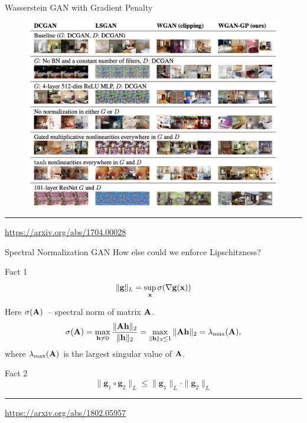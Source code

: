 \begin{frame}{Wasserstein GAN with Gradient Penalty}
	\begin{figure}
		\centering
		\includegraphics[width=0.95\linewidth]{figs/wgan_gp_results}
	\end{figure}
	\vfill
	\hrule\medskip 
	{\scriptsize \href{https://arxiv.org/abs/1704.00028}{https://arxiv.org/abs/1704.00028}}
	
\end{frame}
\begin{frame}{Spectral Normalization GAN}
	How else could we enforce Lipschitzness?
	\begin{block}{Fact 1}
		\vspace{-0.3cm}
		\[
			\| \mathbf{g} \|_L = \sup_{\mathbf{x}} \sigma( \nabla \mathbf{g}(\mathbf{x}))
		\]
	\end{block}
	Here $\sigma(\mathbf{A})$~-- spectral norm of matrix $\mathbf{A}$.
	\[
		\sigma(\mathbf{A}) = \max_{\mathbf{h} \neq 0} \frac{\|\mathbf{A} \mathbf{h}\|_2}{\|\mathbf{h}\|_2} = \max_{\|\mathbf{h}\|_2 \leq 1} \| \mathbf{A} \mathbf{h} \|_2 = \lambda_{\text{max}}(\mathbf{A}),
	\]
	where $\lambda_{\text{max}}(\mathbf{A})$ is the largest singular value of $\mathbf{A}$.
	\begin{block}{Fact 2}
		\vspace{-0.3cm}
		\[
			\| \mathbf{g}_1 \circ \mathbf{g}_2 \|_L \leq \| \mathbf{g}_1 \|_L \cdot \| \mathbf{g}_2\|_L
		\]
	\end{block}
	\vfill
	\hrule\medskip 
	{\scriptsize \href{https://arxiv.org/abs/1802.05957}{https://arxiv.org/abs/1802.05957}}
	
\end{frame}

